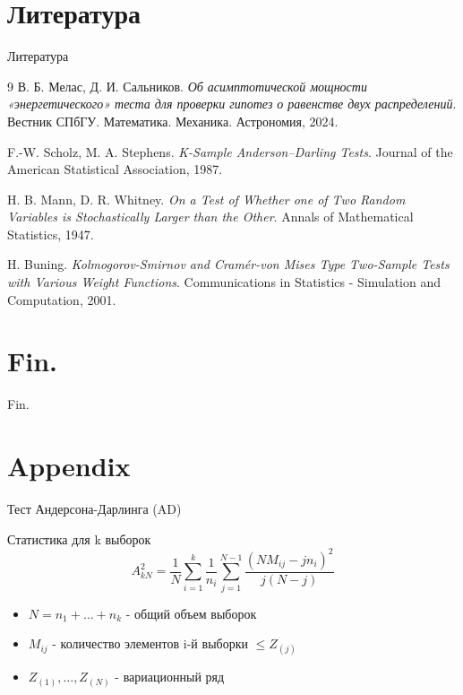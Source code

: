 \documentclass[12pt]{beamer}
\begin{document}
\section*{Литература}
\begin{frame}{Литература}
    \begin{thebibliography}{9}
    В. Б. Мелас, Д. И. Сальников.
    \textit{Об асимптотической мощности «энергетического» теста для проверки гипотез о равенстве двух распределений}.
    Вестник СПбГУ. Математика. Механика. Астрономия, 2024.
    
    F.-W. Scholz, M. A. Stephens.
    \textit{K-Sample Anderson–Darling Tests}.
    Journal of the American Statistical Association, 1987.
    
    H. B. Mann, D. R. Whitney.
    \textit{On a Test of Whether one of Two Random Variables is Stochastically Larger than the Other}.
    Annals of Mathematical Statistics, 1947.
    
    H. Buning.
    \textit{Kolmogorov-Smirnov and Cramér-von Mises Type Two-Sample Tests with Various Weight Functions}.
    Communications in Statistics - Simulation and Computation, 2001.
    \end{thebibliography}
\end{frame}

\section*{Fin.}
\begin{frame}
	\begin{center}
		Fin.
	\end{center}
\end{frame}

\section*{Appendix}

\begin{frame}{Тест Андерсона-Дарлинга (AD)}
	    \begin{block}{Статистика для k выборок}
		        \[
		        A_{kN}^2 = \frac{1}{N} \sum_{i=1}^k \frac{1}{n_i} \sum_{j=1}^{N-1} \frac{(NM_{ij} - jn_i)^2}{j(N-j)}
		      \]
		    \end{block}
	    
	    \begin{itemize}
		        \item $N = n_1 + \ldots + n_k$ - общий объем выборок
		        \item $M_{ij}$ - количество элементов i-й выборки $\leq Z_{(j)}$
		        \item $Z_{(1)}, \ldots, Z_{(N)}$ - вариационный ряд
		    \end{itemize}
	    \end{frame}
\end{document}

